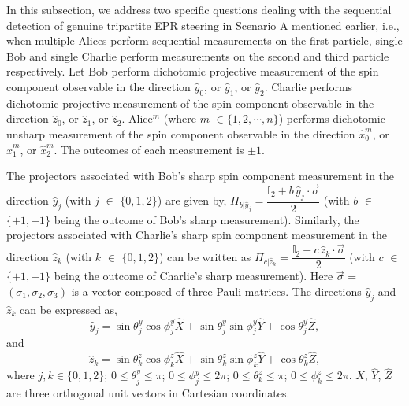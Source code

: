 \documentclass[pra,a4paper,aps,twocolumn,showpacs,superscriptaddress,groupedaddress]{revtex4}
\begin{document}
 In this subsection, we  address two specific questions dealing with the sequential detection of genuine tripartite EPR steering in Scenario A mentioned earlier, i.e., when multiple Alices perform sequential measurements on the first particle, single Bob and single Charlie  perform measurements on the second and third particle respectively. Let Bob perform dichotomic projective measurement of the spin component observable  in the direction $\hat{y}_0$, or  $\hat{y}_1$, or $\hat{y}_2$. Charlie performs dichotomic projective measurement of the spin component observable  in the direction $\hat{z}_0$, or $\hat{z}_1$, or $\hat{z}_2$.  Alice$^m$ (where $m$ $\in \{1, 2, \cdots, n\}$) performs dichotomic unsharp measurement of the spin component observable  in the direction $\hat{x}_0^m$, or $\hat{x}_1^m$, or $\hat{x}_2^m$. The outcomes of each measurement is $\pm1$.

The projectors associated with Bob's sharp spin component measurement in the direction $\hat{y}_j$ (with $j$ $\in$ $\{0,1,2\}$) are given by, $\Pi_{b|\hat{y}_j} = \dfrac{\mathbb{I}_2+b \, \hat{y}_j \cdot \vec{\sigma}}{2}$ (with $b$ $\in$ $\{+1, -1\}$ being the outcome of Bob's sharp measurement). Similarly, the projectors associated with Charlie's sharp spin component measurement in the direction $\hat{z}_k$ (with $k$ $\in$ $\{0,1,2\}$) can be written as $\Pi_{c|\hat{z}_k} = \dfrac{\mathbb{I}_2+c \, \hat{z}_k \cdot \vec{\sigma}}{2}$ (with $c$ $\in$ $\{+1, -1\}$ being the outcome of Charlie's sharp measurement). Here $\vec{\sigma}$ = $(\sigma_1, \sigma_2, \sigma_3)$ is a vector composed of three
Pauli matrices. The directions $\hat{y}_j$ and $\hat{z}_k$ can be expressed as,
\begin{equation}
\label{bobdir}
\hat{y}_j = \sin \theta^{y}_j \cos \phi^{y}_j \hat{X} + \sin \theta^{y}_j \sin \phi^{y}_j \hat{Y} + \cos \theta^{y}_j \hat{Z},
\end{equation}
and 
\begin{equation}
\label{charliedir}
\hat{z}_k = \sin \theta^{z}_k \cos \phi^{z}_k \hat{X} + \sin \theta^{z}_k \sin \phi^{z}_k \hat{Y} + \cos \theta^{z}_k \hat{Z},
\end{equation}
where $j, k \in \{0, 1, 2\}$; $0 \leq \theta^{y}_j  \leq \pi$; $0 \leq \phi^{y}_j  \leq 2 \pi$; $0 \leq \theta^{z}_k  \leq \pi$; $0 \leq \phi^{z}_k  \leq 2 \pi$. $\hat{X}$, $\hat{Y}$, $\hat{Z}$ are three orthogonal unit vectors in Cartesian coordinates. 
\end{document}
